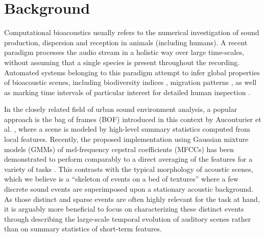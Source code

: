 \documentclass[smallextended]{svjour3}
\makeatletter
\newcommand*{\ie}{i.e.\@\xspace}
\makeatother
\begin{document}
\section{Background} \label{sec:soa}


Computational bioacoustics usually refers to the numerical investigation of sound production, dispersion and reception in animals (including humans). A recent paradigm  processes the audio stream in a holistic way over large time-scales, without assuming that a single species is present throughout the recording. Automated systems belonging to this paradigm attempt to infer global properties of bioacoustic scenes, including biodiversity indices \cite{Bardeli2010}, migration patterns \cite{Obrist2010}, as well as marking time intervals of particular interest for detailed human inspection \cite{rosenstock2002landbird}.

In the closely related field of urban sound environment analysis, a popular approach is the bag of frames (BOF) introduced in this context by Aucouturier et al. \cite{aucouturier2007bag}, where a scene is modeled by high-level summary statistics computed from local features.
Recently, the proposed implementation using Gaussian mixture models (GMMs) of mel-frequency cepstral coefficients (MFCCs) has been demonstrated to perform comparably to a direct averaging of the features for a variety of tasks \cite{lagrange:hal-01082501}.
This contrasts with the typical morphology of acoustic scenes, which we believe is a ``skeleton of events on a bed of textures'' \cite{nelken2013} where a few discrete sound events are superimposed upon a stationary acoustic background.
As those distinct and sparse events are often highly relevant for the task at hand, it is arguably more beneficial to focus on characterizing these distinct events through describing the large-scale temporal evolution of auditory scenes rather than on summary statistics of short-term features.
\end{document}
